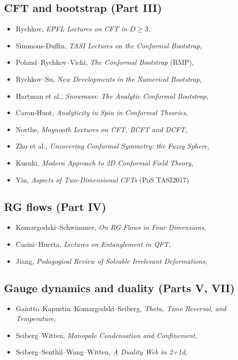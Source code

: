 \subsection*{CFT and bootstrap (Part III)}
\begin{itemize}
\item[$\bullet$] Rychkov, \emph{EPFL Lectures on CFT in $D\ge 3$}, 
\item[$\bullet$] Simmons-Duffin, \emph{TASI Lectures on the Conformal Bootstrap}, 
\item[$\bullet$] Poland--Rychkov--Vichi, \emph{The Conformal Bootstrap} (RMP), 
\item[$\bullet$] Rychkov--Su, \emph{New Developments in the Numerical Bootstrap}, 
\item[$\bullet$] Hartman et al., \emph{Snowmass: The Analytic Conformal Bootstrap}, 
\item[$\circ$] Caron-Huot, \emph{Analyticity in Spin in Conformal Theories}, 
\item[$\bullet$] Northe, \emph{Maynooth Lectures on CFT, BCFT and DCFT}, 
\item[$\circ$] Zhu et al., \emph{Uncovering Conformal Symmetry: the Fuzzy Sphere}, 
\item[$\bullet$] Kusuki, \emph{Modern Approach to 2D Conformal Field Theory}, 
\item[$\bullet$] Yin, \emph{Aspects of Two-Dimensional CFTs} (PoS TASI2017)
\end{itemize}

\subsection*{RG flows (Part IV)}
\begin{itemize}
\item[$\circ$] Komargodski--Schwimmer, \emph{On RG Flows in Four Dimensions}, 
\item[$\bullet$] Casini--Huerta, \emph{Lectures on Entanglement in QFT}, 
\item[$\bullet$] Jiang, \emph{Pedagogical Review of Solvable Irrelevant Deformations}, 
\end{itemize}

\subsection*{Gauge dynamics and duality (Parts V, VII)}
\begin{itemize}
\item[$\circ$] Gaiotto--Kapustin--Komargodski--Seiberg, \emph{Theta, Time Reversal, and Temperature}, 
\item[$\circ$] Seiberg--Witten, \emph{Monopole Condensation and Confinement}, 
\item[$\circ$] Seiberg--Senthil--Wang--Witten, \emph{A Duality Web in 2+1d}, 
\end{itemize}

